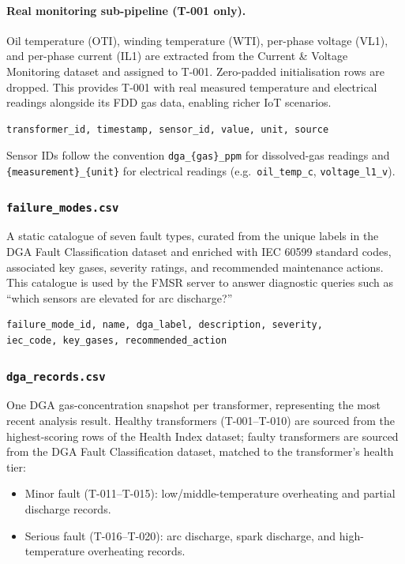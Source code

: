 \paragraph{Real monitoring sub-pipeline (T-001 only).}
Oil temperature (OTI), winding temperature (WTI), per-phase voltage (VL1), and
per-phase current (IL1) are extracted from the Current \& Voltage Monitoring
dataset and assigned to T-001.  Zero-padded initialisation rows are dropped.
This provides T-001 with real measured temperature and electrical readings
alongside its FDD gas data, enabling richer IoT scenarios.

\begin{verbatim}
transformer_id, timestamp, sensor_id, value, unit, source
\end{verbatim}

Sensor IDs follow the convention \texttt{dga\_\{gas\}\_ppm} for dissolved-gas
readings and \texttt{\{measurement\}\_\{unit\}} for electrical readings
(e.g.\ \texttt{oil\_temp\_c}, \texttt{voltage\_l1\_v}).

\subsubsection{\texttt{failure\_modes.csv}}

A static catalogue of seven fault types, curated from the unique labels in the
DGA Fault Classification dataset and enriched with IEC 60599 standard codes,
associated key gases, severity ratings, and recommended maintenance actions.
This catalogue is used by the FMSR server to answer diagnostic queries such as
``which sensors are elevated for arc discharge?''

\begin{verbatim}
failure_mode_id, name, dga_label, description, severity,
iec_code, key_gases, recommended_action
\end{verbatim}

\subsubsection{\texttt{dga\_records.csv}}

One DGA gas-concentration snapshot per transformer, representing the most
recent analysis result.  Healthy transformers (T-001–T-010) are sourced from
the highest-scoring rows of the Health Index dataset; faulty transformers are
sourced from the DGA Fault Classification dataset, matched to the transformer's
health tier:

\begin{itemize}
  \item Minor fault (T-011–T-015): low/middle-temperature overheating and
        partial discharge records.
  \item Serious fault (T-016–T-020): arc discharge, spark discharge, and
        high-temperature overheating records.
\end{itemize}

